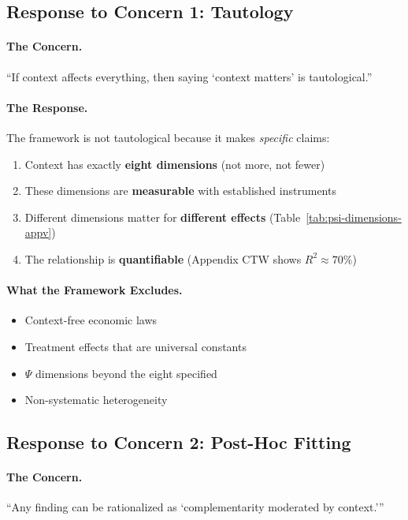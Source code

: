 \subsection{Response to Concern 1: Tautology}

\paragraph{The Concern.}
``If context affects everything, then saying `context matters' is tautological.''

\paragraph{The Response.}
The framework is not tautological because it makes \textit{specific} claims:
\begin{enumerate}
    \item Context has exactly \textbf{eight dimensions} (not more, not fewer)
    \item These dimensions are \textbf{measurable} with established instruments
    \item Different dimensions matter for \textbf{different effects} (Table~\ref{tab:psi-dimensions-appv})
    \item The relationship is \textbf{quantifiable} (Appendix CTW shows $R^2 \approx 70\%$)
\end{enumerate}

\paragraph{What the Framework Excludes.}
\begin{itemize}
    \item Context-free economic laws
    \item Treatment effects that are universal constants
    \item $\Psi$ dimensions beyond the eight specified
    \item Non-systematic heterogeneity
\end{itemize}

\subsection{Response to Concern 2: Post-Hoc Fitting}

\paragraph{The Concern.}
``Any finding can be rationalized as `complementarity moderated by context.'''

